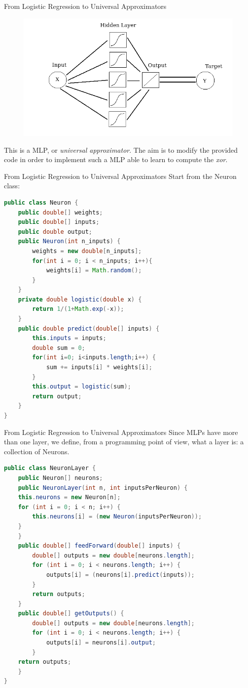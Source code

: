 \documentclass[xcolor ={table,usenames,dvipsnames}]{beamer}
\theoremstyle{definition}
\begin{document}
\begin{frame}{From Logistic Regression to Universal Approximators}
\begin{figure}[h]
	\centering
	\includegraphics[scale=0.35]{../Relazione/img/mymodel}
	\label{fig:mymodel}
\end{figure}
This is a MLP, or \emph{universal approximator}. The aim is to modify the provided code in order to implement such a MLP  able to learn to compute the \emph{xor}.
\end{frame}
\begin{frame}[fragile]{From Logistic Regression to Universal Approximators}
Start from the Neuron class:
\begin{lstlisting}[language=Java]
public class Neuron {
	public double[] weights;
	public double[] inputs;
	public double output;
	public Neuron(int n_inputs) {
		weights = new double[n_inputs];
		for(int i = 0; i < n_inputs; i++){
			weights[i] = Math.random();
		}
	}
	private double logistic(double x) {
		return 1/(1+Math.exp(-x));
	}
	public double predict(double[] inputs) {
		this.inputs = inputs;
		double sum = 0;
		for(int i=0; i<inputs.length;i++) {
			sum += inputs[i] * weights[i];
		}
		this.output = logistic(sum);
		return output;
	}
}
\end{lstlisting}
\end{frame}
\begin{frame}[fragile]{From Logistic Regression to Universal Approximators}
Since MLPs have more than one layer, we define, from a programming point of view, what a layer is: a collection of Neurons.
\begin{lstlisting}[language=Java]
public class NeuronLayer {
	public Neuron[] neurons;
	public NeuronLayer(int n, int inputsPerNeuron) {
	this.neurons = new Neuron[n];
	for (int i = 0; i < n; i++) {
		this.neurons[i] = (new Neuron(inputsPerNeuron));
	}
	}
	public double[] feedForward(double[] inputs) {
		double[] outputs = new double[neurons.length];
		for (int i = 0; i < neurons.length; i++) {
			outputs[i] = (neurons[i].predict(inputs));
		}
		return outputs;
	}
	public double[] getOutputs() {
		double[] outputs = new double[neurons.length];
		for (int i = 0; i < neurons.length; i++) {
			outputs[i] = neurons[i].output;
		}
	return outputs;
	}
}
\end{lstlisting}
\end{frame}
\end{document}
